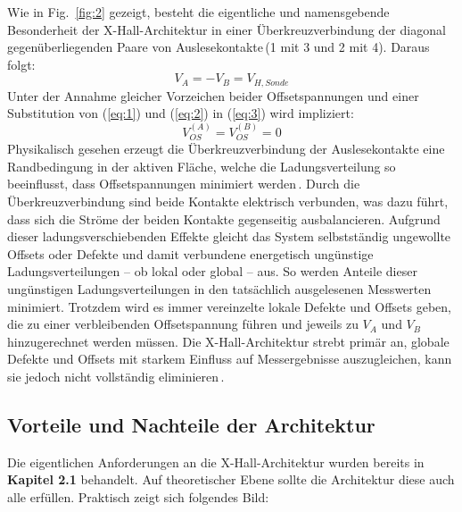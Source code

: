 \documentclass[12pt, a4paper]{article}
\begin{document}
Wie in Fig.~\ref{fig:2} gezeigt, besteht die eigentliche und namensgebende Besonderheit der X-Hall-Architektur in einer Überkreuzverbindung der diagonal gegenüberliegenden Paare von Auslesekontakte\,(1 mit 3 und 2 mit 4). Daraus folgt:
\begin{equation}
	V_A=-V_B=V_{H,Sonde}
	\label{eq:3}
\end{equation}
Unter der Annahme gleicher Vorzeichen beider Offsetspannungen und einer Substitution von (\ref{eq:1}) und (\ref{eq:2}) in (\ref{eq:3}) wird  impliziert:
\begin{equation}
	V_{OS}^{(A)}=V_{OS}^{(B)}=0
	\label{eq:4}
\end{equation}
Physikalisch gesehen erzeugt die Überkreuzverbindung der Auslesekontakte eine  Randbedingung in der aktiven Fläche, welche die Ladungsverteilung so beeinflusst, dass Offsetspannungen minimiert werden\,\cite{cres21}. 
Durch die Überkreuzverbindung sind beide Kontakte elektrisch verbunden, was dazu führt, dass sich die Ströme der beiden Kontakte gegenseitig ausbalancieren. %
Aufgrund dieser ladungsverschiebenden Effekte gleicht das System selbstständig ungewollte Offsets oder Defekte und damit verbundene energetisch ungünstige Ladungsverteilungen – ob lokal oder global – aus. %
So werden Anteile dieser ungünstigen Ladungsverteilungen in den tatsächlich ausgelesenen Messwerten minimiert.\newline
Trotzdem wird es immer vereinzelte lokale Defekte und Offsets geben, die zu einer verbleibenden Offsetspannung führen und jeweils zu $V_A$ und $V_B$ hinzugerechnet werden müssen. Die X-Hall-Architektur strebt primär an, globale Defekte und Offsets mit starkem Einfluss auf Messergebnisse auszugleichen, kann sie jedoch nicht vollständig eliminieren\,\cite{cres21}.

\subsection{Vorteile und Nachteile der Architektur}
Die eigentlichen Anforderungen an die X-Hall-Architektur wurden bereits in \textbf{Kapitel 2.1} behandelt. Auf theoretischer Ebene sollte die Architektur diese auch alle erfüllen.\newline
Praktisch zeigt sich folgendes Bild:\paragraph{}
\end{document}
